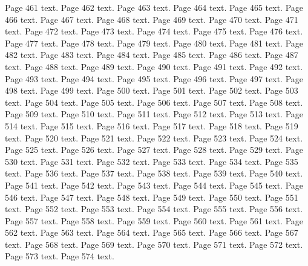 \documentclass{article}
\begin{document}
Page 461 text.\newpage
Page 462 text.\newpage
Page 463 text.\newpage
Page 464 text.\newpage
Page 465 text.\newpage
Page 466 text.\newpage
Page 467 text.\newpage
Page 468 text.\newpage
Page 469 text.\newpage
Page 470 text.\newpage
Page 471 text.\newpage
Page 472 text.\newpage
Page 473 text.\newpage
Page 474 text.\newpage
Page 475 text.\newpage
Page 476 text.\newpage
Page 477 text.\newpage
Page 478 text.\newpage
Page 479 text.\newpage
Page 480 text.\newpage
Page 481 text.\newpage
Page 482 text.\newpage
Page 483 text.\newpage
Page 484 text.\newpage
Page 485 text.\newpage
Page 486 text.\newpage
Page 487 text.\newpage
Page 488 text.\newpage
Page 489 text.\newpage
Page 490 text.\newpage
Page 491 text.\newpage
Page 492 text.\newpage
Page 493 text.\newpage
Page 494 text.\newpage
Page 495 text.\newpage
Page 496 text.\newpage
Page 497 text.\newpage
Page 498 text.\newpage
Page 499 text.\newpage
Page 500 text.\newpage
Page 501 text.\newpage
Page 502 text.\newpage
Page 503 text.\newpage
Page 504 text.\newpage
Page 505 text.\newpage
Page 506 text.\newpage
Page 507 text.\newpage
Page 508 text.\newpage
Page 509 text.\newpage
Page 510 text.\newpage
Page 511 text.\newpage
Page 512 text.\newpage
Page 513 text.\newpage
Page 514 text.\newpage
Page 515 text.\newpage
Page 516 text.\newpage
Page 517 text.\newpage
Page 518 text.\newpage
Page 519 text.\newpage
Page 520 text.\newpage
Page 521 text.\newpage
Page 522 text.\newpage
Page 523 text.\newpage
Page 524 text.\newpage
Page 525 text.\newpage
Page 526 text.\newpage
Page 527 text.\newpage
Page 528 text.\newpage
Page 529 text.\newpage
Page 530 text.\newpage
Page 531 text.\newpage
Page 532 text.\newpage
Page 533 text.\newpage
Page 534 text.\newpage
Page 535 text.\newpage
Page 536 text.\newpage
Page 537 text.\newpage
Page 538 text.\newpage
Page 539 text.\newpage
Page 540 text.\newpage
Page 541 text.\newpage
Page 542 text.\newpage
Page 543 text.\newpage
Page 544 text.\newpage
Page 545 text.\newpage
Page 546 text.\newpage
Page 547 text.\newpage
Page 548 text.\newpage
Page 549 text.\newpage
Page 550 text.\newpage
Page 551 text.\newpage
Page 552 text.\newpage
Page 553 text.\newpage
Page 554 text.\newpage
Page 555 text.\newpage
Page 556 text.\newpage
Page 557 text.\newpage
Page 558 text.\newpage
Page 559 text.\newpage
Page 560 text.\newpage
Page 561 text.\newpage
Page 562 text.\newpage
Page 563 text.\newpage
Page 564 text.\newpage
Page 565 text.\newpage
Page 566 text.\newpage
Page 567 text.\newpage
Page 568 text.\newpage
Page 569 text.\newpage
Page 570 text.\newpage
Page 571 text.\newpage
Page 572 text.\newpage
Page 573 text.\newpage
Page 574 text.\newpage
\end{document}
